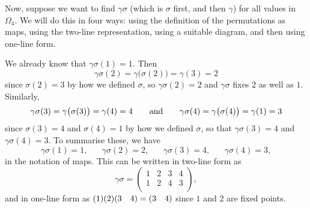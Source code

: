 \begin{example}
    Now, suppose we want to find $\gamma\sigma$ (which is $\sigma$ first, and then $\gamma$) for all values in $\Omega_{4}$. We will do this in four ways: using the definition of the permutations as maps, using the two-line representation, using a suitable diagram, and then using one-line form.

     We already know that $\gamma\sigma(1) = 1$. Then
    \[
    \gamma\sigma(2) = \gamma\big(\sigma(2)\big) = \gamma(3) = 2
    \]
    since $\sigma(2) = 3$ by how we defined $\sigma$, so $\gamma\sigma(2) = 2$ and $\gamma\sigma$ fixes $2$ as well as $1$. Similarly,
    \[
    \gamma\sigma(3) = \gamma\big(\sigma(3)\big) = \gamma(4) = 4 \hspace{20pt}\text{and}\hspace{20pt} \gamma\sigma(4) = \gamma\big(\sigma(4)\big) = \gamma(1) = 3
    \]
    since $\sigma(3) = 4$ and $\sigma(4) = 1$ by how we defined $\sigma$, so that $\gamma\sigma(3) = 4$ and $\gamma\sigma(4) = 3$. To summarise these, we have
    \[
    \gamma\sigma(1) = 1, \hspace{20pt} \gamma\sigma(2) = 2, \hspace{20pt} \gamma\sigma(3) = 4, \hspace{20pt} \gamma\sigma(4) = 3,
    \]
    in the notation of maps. This can be written in two-line form as
    \[
    \gamma\sigma = \begin{pmatrix}
        1 & 2 & 3 & 4 \\
        1 & 2 & 4 & 3 \\
    \end{pmatrix},
    \]
    and in one-line form as $(1)(2)(3 \quad 4) = (3 \quad 4)$ since $1$ and $2$ are fixed points.


\end{example}

